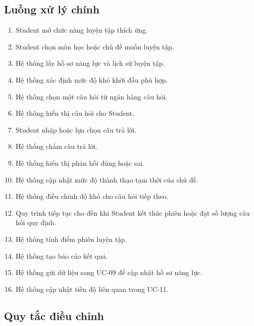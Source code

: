 \subsection{Luồng xử lý chính}

\begin{enumerate}
	\item Student mở chức năng luyện tập thích ứng.
	
	\item Student chọn môn học hoặc chủ đề muốn luyện tập.
	
	\item Hệ thống lấy hồ sơ năng lực và lịch sử luyện tập.
	
	\item Hệ thống xác định mức độ khó khởi đầu phù hợp.
	
	\item Hệ thống chọn một câu hỏi từ ngân hàng câu hỏi.
	
	\item Hệ thống hiển thị câu hỏi cho Student.
	
	\item Student nhập hoặc lựa chọn câu trả lời.
	
	\item Hệ thống chấm câu trả lời.
	
	\item Hệ thống hiển thị phản hồi đúng hoặc sai.
	
	\item Hệ thống cập nhật mức độ thành thạo tạm thời của chủ đề.
	
	\item Hệ thống điều chỉnh độ khó cho câu hỏi tiếp theo.
	
	\item Quy trình tiếp tục cho đến khi Student kết thúc phiên hoặc đạt
	số lượng câu hỏi quy định.
	
	\item Hệ thống tính điểm phiên luyện tập.
	
	\item Hệ thống tạo báo cáo kết quả.
	
	\item Hệ thống gửi dữ liệu sang UC-09 để cập nhật hồ sơ năng lực.
	
	\item Hệ thống cập nhật tiến độ liên quan trong UC-11.
\end{enumerate}

\subsection{Quy tắc điều chỉnh}


